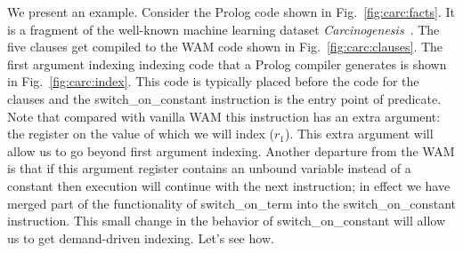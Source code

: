 \documentclass{llncs}
\newcommand{\instr}[1]{\textsf{#1}}
\newcommand{\switchONterm}{\mbox{\instr{switch\_on\_term}}\xspace}
\newcommand{\switchONconstant}{\mbox{\instr{switch\_on\_constant}}\xspace}
\newcommand{\JITI}{demand-driven indexing\xspace}
\begin{document}
We present an example. Consider the Prolog code shown in
Fig.~\ref{fig:carc:facts}. It is a fragment of the well-known machine
learning dataset \textit{Carcinogenesis}~\cite{Carcinogenesis@ILP-97}.
The five clauses get compiled to the WAM code shown in
Fig.~\ref{fig:carc:clauses}. The first argument indexing indexing code
that a Prolog compiler generates is shown in
Fig.~\ref{fig:carc:index}. This code is typically placed before the
code for the clauses and the \switchONconstant instruction is the
entry point of predicate. Note that compared with vanilla WAM this
instruction has an extra argument: the register on the value of which
we will index ($r_1$). This extra argument will allow us to go beyond
first argument indexing. Another departure from the WAM is that if
this argument register contains an unbound variable instead of a
constant then execution will continue with the next instruction; in
effect we have merged part of the functionality of \switchONterm into
the \switchONconstant instruction. This small change in the behavior
of \switchONconstant will allow us to get \JITI. Let's see how.
\end{document}
